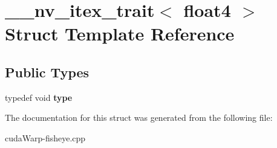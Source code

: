 \hypertarget{struct____nv__itex__trait_3_01float4_01_4}{}\section{\+\_\+\+\_\+nv\+\_\+itex\+\_\+trait$<$ float4 $>$ Struct Template Reference}
\label{struct____nv__itex__trait_3_01float4_01_4}
\subsection*{Public Types}
\begin{DoxyCompactItemize}
\item 
typedef void {\bfseries type}\hypertarget{struct____nv__itex__trait_3_01float4_01_4_ad457b5a37e4a77cc07f6a1e5cf35f20d}{}\label{struct____nv__itex__trait_3_01float4_01_4_ad457b5a37e4a77cc07f6a1e5cf35f20d}

\end{DoxyCompactItemize}


The documentation for this struct was generated from the following file\+:\begin{DoxyCompactItemize}
\item 
cuda\+Warp-\/fisheye.\+cpp\end{DoxyCompactItemize}
